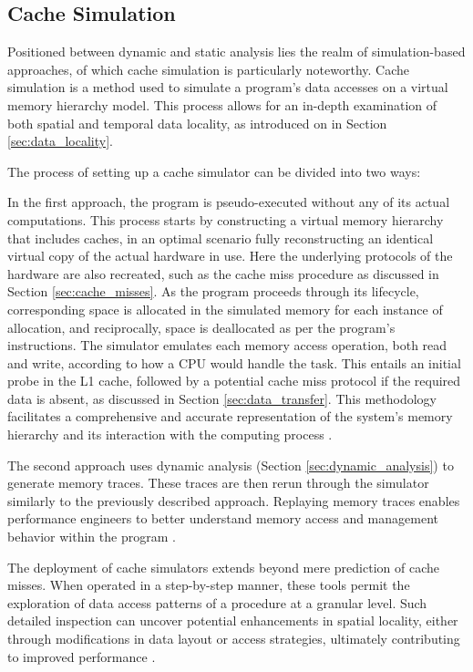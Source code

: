 \subsection{Cache Simulation}\label{sec:simulation}

Positioned between dynamic and static analysis lies the realm of simulation-based approaches, of which cache simulation is particularly noteworthy. Cache simulation is a method used to simulate a program's data accesses on a virtual memory hierarchy model. This process allows for an in-depth examination of both spatial and temporal data locality, as introduced on in Section \ref{sec:data_locality}.

The process of setting up a cache simulator can be divided into two ways:

In the first approach, the program is pseudo-executed without any of its actual computations. This process starts by constructing a virtual memory hierarchy that includes caches, in an optimal scenario fully reconstructing an identical virtual copy of the actual hardware in use. Here the underlying protocols of the hardware are also recreated, such as the cache miss procedure as discussed in Section \ref{sec:cache_misses}. As the program proceeds through its lifecycle, corresponding space is allocated in the simulated memory for each instance of allocation, and reciprocally, space is deallocated as per the program's instructions. The simulator emulates each memory access operation, both read and write, according to how a CPU would handle the task. This entails an initial probe in the L1 cache, followed by a potential cache miss protocol if the required data is absent, as discussed in Section \ref{sec:data_transfer}. This methodology facilitates a comprehensive and accurate representation of the system's memory hierarchy and its interaction with the computing process \cite{schaad2022boosting,hammer2017kerncraft}.

The second approach uses dynamic analysis (Section \ref{sec:dynamic_analysis}) to generate memory traces. These traces are then rerun through the simulator similarly to the previously described approach. Replaying memory traces enables performance engineers to better understand memory access and management behavior within the program \cite{choudhury2011abstract}.

The deployment of cache simulators extends beyond mere prediction of cache misses. When operated in a step-by-step manner, these tools permit the exploration of data access patterns of a procedure at a granular level. Such detailed inspection can uncover potential enhancements in spatial locality, either through modifications in data layout or access strategies, ultimately contributing to improved performance \cite{schaad2022boosting,hammer2017kerncraft,choudhury2011abstract}.

